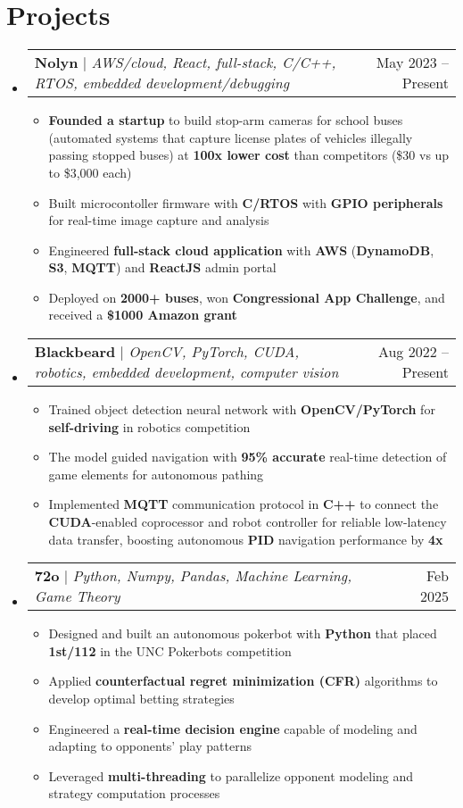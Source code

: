 \documentclass[letterpaper,11pt]{article}
\makeatletter
\newcommand{\resumeItem}[1]{
  \item\small{
    {#1 \vspace{-2pt}}}
}
\newcommand{\resumeProjectHeading}[2]{
    \item
    \begin{tabular*}{0.97\textwidth}{l@{\extracolsep{\fill}}r}
      \small#1 & #2 \\
    \end{tabular*}\vspace{-7pt}
}
\newcommand{\resumeSubHeadingListStart}{\begin{itemize}[leftmargin=0.15in, label={}]}
\newcommand{\resumeSubHeadingListEnd}{\end{itemize}}
\newcommand{\resumeItemListStart}{\begin{itemize}}
\newcommand{\resumeItemListEnd}{\end{itemize}\vspace{-5pt}}
\makeatother
\begin{document}
\section{Projects}
    \resumeSubHeadingListStart
      \resumeProjectHeading
          {\textbf{Nolyn} $|$ \emph{AWS/cloud, React, full-stack, C/C++, RTOS, embedded development/debugging}}{May 2023 -- Present}
          \resumeItemListStart
            \resumeItem{\textbf{Founded a startup} to build stop-arm cameras for school buses (automated systems that capture license plates of vehicles illegally passing stopped buses) at \textbf{100x lower cost} than competitors (\$30 vs up to \$3,000 each)}
            \resumeItem{Built microcontoller firmware with \textbf{C/RTOS} with \textbf{GPIO peripherals} for real-time image capture and analysis}
            \resumeItem{Engineered \textbf{full-stack cloud application} with \textbf{AWS} (\textbf{DynamoDB}, \textbf{S3}, \textbf{MQTT}) and \textbf{ReactJS} admin portal}
            \resumeItem{Deployed on \textbf{2000+ buses}, won \textbf{Congressional App Challenge}, and received a \textbf{\$1000 Amazon grant}}
          \resumeItemListEnd
      \vspace{-4pt}
      \resumeProjectHeading
        {\textbf{Blackbeard} $|$ \emph{OpenCV, PyTorch, CUDA, robotics, embedded development, computer vision}}{Aug 2022 -- Present}
        \resumeItemListStart
          \resumeItem{Trained object detection neural network with \textbf{OpenCV/PyTorch} for \textbf{self-driving} in robotics competition}
          \resumeItem{The model guided navigation with \textbf{95\% accurate} real-time detection of game elements for autonomous pathing}
          \resumeItem{Implemented \textbf{MQTT} communication protocol in \textbf{C++} to connect the \textbf{CUDA}-enabled coprocessor and robot controller for reliable low-latency data transfer, boosting autonomous \textbf{PID} navigation performance by \textbf{4x}}
        \resumeItemListEnd
        \vspace{-4pt}
        \resumeProjectHeading
          {\textbf{72o} $|$ \emph{Python, Numpy, Pandas, Machine Learning, Game Theory}}{Feb 2025}
          \resumeItemListStart
            \resumeItem{Designed and built an autonomous pokerbot with \textbf{Python} that placed \textbf{1st/112} in the UNC Pokerbots competition}
            \resumeItem{Applied \textbf{counterfactual regret minimization (CFR)} algorithms to develop optimal betting strategies}
            \resumeItem{Engineered a \textbf{real-time decision engine} capable of modeling and adapting to opponents' play patterns}
            \resumeItem{Leveraged \textbf{multi-threading} to parallelize opponent modeling and strategy computation processes}
          \resumeItemListEnd
    \resumeSubHeadingListEnd
\end{document}
